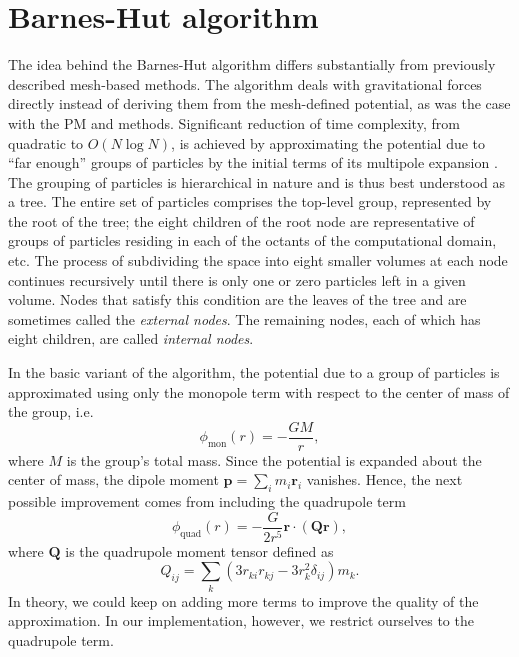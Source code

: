 \chapter{Barnes-Hut algorithm}
The idea behind the Barnes-Hut algorithm differs substantially from previously described mesh-based methods.
The algorithm deals with gravitational forces directly instead of deriving them from the mesh-defined potential, as was the case with the PM and \PThreeM{} methods.
Significant reduction of time complexity, from quadratic to $O(N \log N)$, is achieved by approximating the potential due to ``far enough'' groups of particles by the initial terms of its multipole expansion \cite{trenti2008gravitationalnbodysimulations}.
The grouping of particles is hierarchical in nature and is thus best understood as a tree.
The entire set of particles comprises the top-level group, represented by the root of the tree;
the eight children of the root node are representative of groups of particles residing in each of the octants of the computational domain, etc.
The process of subdividing the space into eight smaller volumes at each node continues recursively until there is only one or zero particles left in a given volume.
Nodes that satisfy this condition are the leaves of the tree and are sometimes called the \textit{external nodes}.
The remaining nodes, each of which has eight children, are called \textit{internal nodes}.

In the basic variant of the algorithm, the potential due to a group of particles is approximated using only the monopole term with respect to the center of mass of the group, i.e.
\begin{equation*}
    \phi_\text{mon}(r) = -\frac{GM}{r},
\end{equation*}
where $M$ is the group's total mass.
Since the potential is expanded about the center of mass, the dipole moment $\mathbf{p} = \sum_{i} m_i \mathbf{r}_i$ vanishes.
Hence, the next possible improvement comes from including the quadrupole term
\begin{equation*}
    \phi_\text{quad}(r) = -\frac{G}{2r^5} \mathbf{r} \cdot (\mathbf{Q} \mathbf{r}),
\end{equation*}
where $\mathbf{Q}$ is the quadrupole moment tensor defined as
\begin{equation*}
    Q_{ij} = \sum_{k} (3r_{ki}r_{kj} - 3r_k^2\delta_{ij})m_k.
\end{equation*}
In theory, we could keep on adding more terms to improve the quality of the approximation.
In our implementation, however, we restrict ourselves to the quadrupole term.




